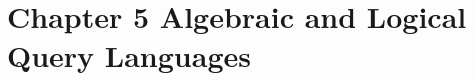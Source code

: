 \documentclass[../../main.tex]{subfiles}
\begin{document}
\section{Chapter 5 Algebraic and Logical Query Languages}





\end{document}
